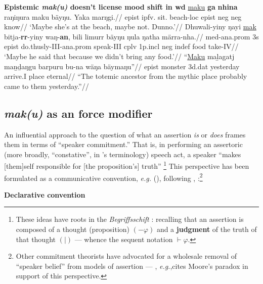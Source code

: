 	\pex\textbf{Epistemic \textit{mak(u)} doesn't license mood shift in \gls{wd}}
	\a\begingl
	\gla \ul{maku} \textbf{ga} \textbf{nhina} raŋiŋura maku bäyŋu. Yaka marŋgi.//
	\glb \gls{epist} \gls{ipfv}.\I{} sit.\I{} beach-\gls{loc} \gls{epist} \gls{neg} \gls{neg} know//
	\glft`Maybe she's at the beach, maybe not. Dunno.'\trailingcitation{[DB~20191416]}//\endgl
	\a\begingl\gla Dhuwali-yiny ŋayi \ul{mak} bitja-\textbf{rr}-yiny waŋ-\textbf{an}, bili limurr bäyŋu ŋula ŋatha märra-nha.//
	\glb \gls{med}-\gls{ana}.\gls{prom} 3s \gls{epist} do.thusly-\gls{III}-\gls{ana}.\gls{prom} speak-\gls{III} \gls{cplv} 1p.\gls{incl} \gls{neg} \gls{indef} food take-\gls{IV}//
	\glft`Maybe he said that because we didn't bring any food.'\trailingcitation{[\citetalias[Mathyu~16:7]{DB}]}//\endgl
	\a\begingl\gla ``\ul{Maku} maḻagatj maṉḏaŋgu barpuru bu-na wäŋa bäymaŋu''//
	\glb \gls{epist} monster 3d.\gls{dat} yesterday arrive.\gls{I} place eternal//
	\glft``The totemic ancestor from the mythic place probably came to them yesterday.''//\endgl
	\xe
	
	
\subsection{\textit{mak(u)} as an force modifier}\label{sec:mak2}


An influential approach to the question of what an assertion \textit{is} or \textit{does} frames them in terms of ``speaker commitment.'' That is, in performing an assertoric (more broadly, ``constative'', in \citeauthor{Searle1975}'s terminology) speech act, a speaker ``makes [them]self responsible for [the proposition's] truth'' \citetext{\citealp{Peirce1934}, cited in \citealp{MacFarlane2011}; see also \citet{Brandom1983, Williamson1996} a.o.}\footnote{These ideas have roots in the \textit{Begriffsschift} \citep{Frege1879}: \citet[83]{Krifka2019} recalling that an assertion is composed of a thought (proposition) $ (-\varphi) $ and a \textbf{judgment} of the truth of that thought $ (\mid) $ --- whence the sequent notation $ \vdash{\varphi} $.} This perspective has been formulated as a communicative convention, \textit{e.g.} (\nextx), following \citet[105]{Lauer2013}, \citet[157]{Condoravdi2011}:\footnote{Other commitment theorists have advocated for a wholesale removal of ``speaker belief'' from models of assertion --- \citet[78]{Krifka2019}, \textit{e.g.},cites Moore's paradox in support of this perspective.}

\pex \textbf{Declarative convention}

